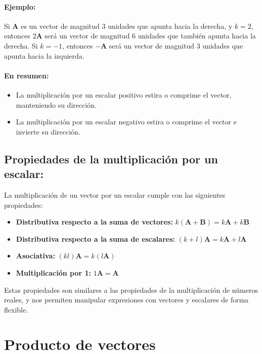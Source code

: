 \documentclass{book}
\begin{document}
\paragraph{Ejemplo:}

Si $\mathbf{A}$ es un vector de magnitud 3 unidades que apunta hacia la derecha, y $k = 2$, entonces $2\mathbf{A}$ será un vector de magnitud 6 unidades que también apunta hacia la derecha. Si $k = -1$, entonces $-\mathbf{A}$ será un vector de magnitud 3 unidades que apunta hacia la izquierda.

\paragraph{En resumen:}

\begin{itemize}
\item[\textbullet] La multiplicación por un escalar positivo estira o comprime el vector, manteniendo su dirección.
\item[\textbullet] La multiplicación por un escalar negativo estira o comprime el vector e invierte su dirección.
\end{itemize}

\subsection{Propiedades de la multiplicación por un escalar:}

La multiplicación de un vector por un escalar cumple con las siguientes propiedades:

\begin{itemize}
\item[\textbullet] \textbf{Distributiva respecto a la suma de vectores:} $k (\mathbf{A} + \mathbf{B}) = k\mathbf{A} + k\mathbf{B}$
 \item[\textbullet] \textbf{Distributiva respecto a la suma de escalares:} $(k + l)\mathbf{A} = k\mathbf{A} + l\mathbf{A}$
\item[\textbullet] \textbf{Asociativa:} $(k l)\mathbf{A} = k(l\mathbf{A})$
\item[\textbullet] \textbf{Multiplicación por 1:} $1\mathbf{A} = \mathbf{A}$
\end{itemize}

Estas propiedades son similares a las propiedades de la multiplicación de números reales, y nos permiten manipular expresiones con vectores y escalares de forma flexible.

\section{Producto de vectores}
\end{document}
